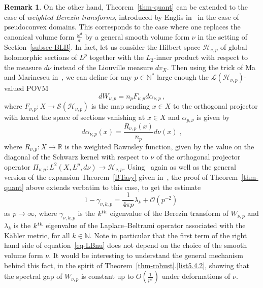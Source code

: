 \documentclass[11pt]{article}
\theoremstyle{definition}
\newtheorem{rema}[theo]{Remark}
\numberwithin{equation}{section}
\numberwithin{figure}{section}
\numberwithin{table}{section}
\newcommand{\R}{{\mathbb{R}}}
\newcommand{\N}{{\mathbb{N}}}
\newcommand{\cH}{{\mathcal{H}}}
\newcommand{\cS}{{\mathcal{S}}}
\newcommand{\om}{{\omega}}
\newcommand{\bigo}{\mathcal{O}}
\newcommand\< {\mathcal{h}}
\renewcommand\> {\mathcal{i}}
\newcommand*\cL{\mathscr{L}}
\begin{document}
\begin{rema}\label{weightedBT}
On the other hand, Theorem~\ref{thm-quant} can be extended to the case of \emph{weighted Berezin transforms}, introduced by Englis in~\cite{E00} in the case of pseudoconvex domains. This corresponds to the case where one replaces the canonical volume form $\frac{\om^d}{d!}$ by a general smooth volume form $\nu$ in the setting of Section~\ref{subsec-BLB}. In fact, let us consider the Hilbert space $\cH_{\nu,p}$ of global holomorphic sections of $L^p$ together with the $L_2$-inner product with respect to the measure $d\nu$ instead of the Liouville measure $dv_X$. Then using the trick of Ma and Marinescu in~\cite[Section~4.1.9]{MM07}, we can define for any $p\in\N^*$ large enough the $\cL(\cH_{\nu,p})$-valued POVM
\begin{equation}\label{Wnup}
dW_{\nu,p}=n_pF_{\nu,p}d\alpha_{\nu,p}\,,
\end{equation}
where $F_{\nu,p}:X\rightarrow\cS(\cH_{\nu,p})$ is the map sending $x\in X$ to the orthogonal projector with kernel the space of sections vanishing at $x\in X$ and $\alpha_{p,\nu}$ is given by
\begin{equation}\label{eq-alphahbarnu}
d\alpha_{\nu,p}(x) = \frac{R_{\nu,p}(x)}{n_p}d\nu(x)\;,
\end{equation}
where $R_{\nu,p}:X\rightarrow\R$ is the weighted Rawnsley function, given by the value on the diagonal of the Schwarz kernel with respect to $\nu$ of the orthogonal projector operator $\Pi_{\nu,p}:L^2(X,L^p,d\nu)\rightarrow\cH_{\nu,p}$. Using~\cite[Section~4.19]{MM07} again as well as the general version of the expansion Theorem~\ref{BTasy} given in~\cite[Theorem~4.18']{DLM06}, the proof of Theorem~\ref{thm-quant} above extends verbatim to this case, to get the estimate
\begin{equation}\label{eq-LBnu}
1-\gamma_{\nu,k,p} =\frac{1}{4\pi p}\lambda_k + \bigo\left(p^{-2}\right)\;
\end{equation}
as $p\rightarrow\infty$, where $\gamma_{\nu,k,p}$ is the $k^{\rm th}$ eigenvalue of the Berezin transform of $W_{\nu,p}$ and $\lambda_k$ is the $k^{\rm th}$ eigenvalue of the Laplace--Beltrami operator associated with the K\"ahler metric, for all $k\in\N$. Note in particular that the first term of the right hand side of equation~\eqref{eq-LBnu} does not depend on the choice of the smooth volume form $\nu$. It would be interesting to understand the general mechanism behind this fact, in the spirit of Theorem~\ref{thm-robust}.\eqref{list5.4.2}, showing that the spectral gap of $W_{\nu,p}$ is constant up to $O(\frac{1}{p^2})$ under deformations of $\nu$.
\end{rema}
\end{document}
